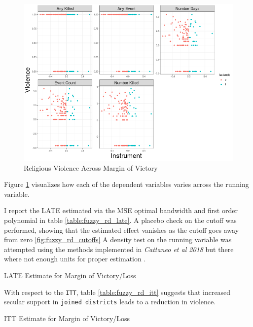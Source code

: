 \documentclass{scrartcl}
\begin{document}
\begin{figure}[h!]
  \centering
  \includegraphics[width=0.9\linewidth]{replication/output/fuzzy_rd_data.png}
  \caption{Religious Violence Across Margin of Victory}
  \label{fig:fuzzy_rd_data}
\end{figure}

Figure \ref{fig:fuzzy_rd_data} visualizes how each of the dependent variables varies across the running variable. 



I report the LATE estimated via the MSE optimal bandwidth and first order polynomial in table \ref{table:fuzzy_rd_late}.
A placebo check on the cutoff was performed, showing that the estimated effect vanishes as the cutoff goes away from zero \ref{fig:fuzzy_rd_cutoffs}
A density test on the running variable was attempted using the methods implemented in \textit{Cattaneo et al 2018} but there where not enough units for proper estimation \cite{cattaneo_2018}.

\begin{table}[h!]
  \begin{center}
    \scalebox{0.75}{
      
    }
    \caption{LATE Estimate for Margin of Victory/Loss}
    \label{table:fuzzy_rd_late}
  \end{center}
\end{table}


With respect to the \texttt{ITT}, table \ref{table:fuzzy_rd_itt} suggests that increased secular support in \texttt{joined districts} leads to a reduction in violence.

\begin{table}[h!]
  \begin{center}
    \scalebox{0.65}{
      
    }
    \caption{ITT Estimate for Margin of Victory/Loss}
    \label{table:fuzzy_rd_itt}
  \end{center}
\end{table}
\end{document}
